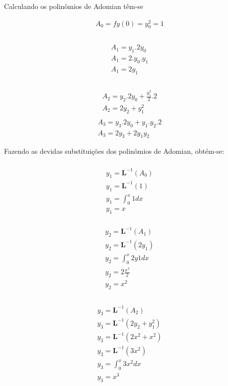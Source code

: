 Calculando os polinômios de Adomian têm-se

\begin{gather*}
  A_{0} = fy(0) = y_{0}^2 = 1
\end{gather*}
\nonumber\\
\begin{gather*}\nonumber\\
  A_{1} = y_{1}.2y_{0} \nonumber\\
  A_{1} = 2.y_{0}.y_{1}\nonumber\\
  A_{1} = 2y_{1}\nonumber\\
\end{gather*}\nonumber\\
\begin{gather*}
A_{2} = y_{2}.2y_{0} + \frac{y_{1}^{2}}{2}.2 \nonumber\\
  A_{2} = 2y_{2} + y_{1}^2\nonumber\\
  \end{gather*}
\begin{gather*}
  A_{3} = y_{3}.2y_{0} + y_{1}.y_{2}.2 \nonumber\\
  A_{3} = 2y_{3} + 2y_{1}y_{2}
 \end{gather*}

Fazendo as devidas substituições dos polinômios de Adomian, obtém-se:

\begin{gather*}\nonumber\\
y_{1} = \textbf{L}^{-1} (A_{0})\nonumber\\
  y_{1} = \textbf{L}^{-1} (1)\nonumber\\
  y_{1} = \int_0^{x}1dx\nonumber\\
  y_{1} = x
\end{gather*}

\begin{gather*}\nonumber\\
y_{2} = \textbf{L}^{-1} (A_{1})\nonumber\\
  y_{2} = \textbf{L}^{-1}(2y_{1})\nonumber\\
  y_{2} = \int_0^{x}2y1dx\nonumber\\
  y_{2} = 2\frac {x^{2}}{2}\nonumber\\
  y_{2} = x^2\nonumber\\
\end{gather*}


\begin{gather*}\nonumber\\
y_{3} = \textbf{L}^{-1} (A_{2})\nonumber\\
  y_{3} = \textbf{L}^{-1}(2y_{2} + y_{1}^2)\nonumber\\
  y_{3} = \textbf{L}^{-1}(2x^2 + x^2)\nonumber\\
  y_{3} = \textbf{L}^{-1}(3x^2)\nonumber\\
  y_{3} = \int_0^{x}3x^2dx\nonumber\\
  y_{3} = x^3\nonumber\\
\end{gather*}

